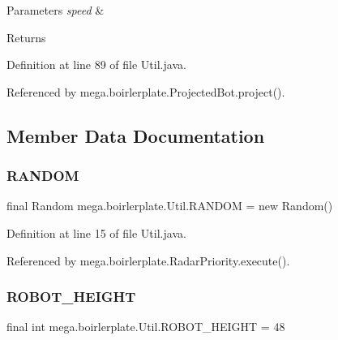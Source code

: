 \begin{DoxyParams}{Parameters}
{\em speed} & \\
\hline
\end{DoxyParams}
\begin{DoxyReturn}{Returns}

\end{DoxyReturn}


Definition at line 89 of file Util.\+java.



Referenced by mega.\+boirlerplate.\+Projected\+Bot.\+project().



\subsection{Member Data Documentation}
\mbox{\label{classmega_1_1boirlerplate_1_1_util_a73e0b59edb9b6d335b2407aaa7989d39}} 
\subsubsection{\texorpdfstring{R\+A\+N\+D\+OM}{RANDOM}}
{\footnotesize\ttfamily final Random mega.\+boirlerplate.\+Util.\+R\+A\+N\+D\+OM = new Random()\hspace{0.3cm}{\ttfamily [static]}}



Definition at line 15 of file Util.\+java.



Referenced by mega.\+boirlerplate.\+Radar\+Priority.\+execute().

\mbox{\label{classmega_1_1boirlerplate_1_1_util_ad8d3444f57297eec764c0aabf42c6c85}} 
\subsubsection{\texorpdfstring{R\+O\+B\+O\+T\+\_\+\+H\+E\+I\+G\+HT}{ROBOT\_HEIGHT}}
{\footnotesize\ttfamily final int mega.\+boirlerplate.\+Util.\+R\+O\+B\+O\+T\+\_\+\+H\+E\+I\+G\+HT = 48\hspace{0.3cm}{\ttfamily [static]}}




